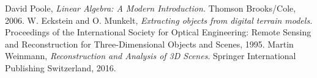 \documentclass[a4paper,11pt,twoside]{article}
\theoremstyle{definition}
\theoremstyle{remark}
\newcommand{\sh}[1]{\colorbox{pink}{#1}}
\newcommand{\lnk}[1]{\sh{\hyperref[#1]{\ref*{#1}}}}
\begin{document}
%
\newpage
\begin{thebibliography}{99}
 David Poole, \emph{Linear Algebra: A Modern Introduction.} Thomson Brooks/Cole, 2006.
 W. Eckstein and O. Munkelt, \emph{Extracting objects from digital terrain
models.} Proceedings of the International Society for Optical Engineering: Remote Sensing
and Reconstruction for Three-Dimensional Objects and Scenes, 1995.
 Martin Weinmann, \emph{Reconstruction and Analysis
of 3D Scenes}. Springer International Publishing Switzerland, 2016.
\end{thebibliography}
\end{document}
